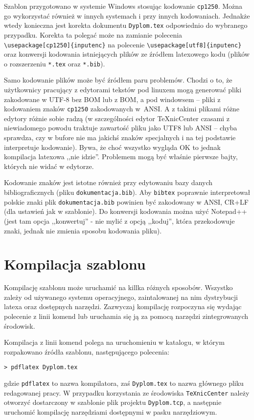 Szablon przygotowano w systemie Windows stosując kodowanie \texttt{cp1250}. Można go wykorzystać również w innych systemach i przy innych kodowaniach. Jednakże wtedy konieczna jest korekta dokumentu \texttt{Dyplom.tex} odpowiednio do wybranego przypadku. Korekta ta polegać może na zamianie polecenia \verb+\usepackage[cp1250]{inputenc}+  na polecenie \verb+\usepackage[utf8]{inputenc}+ oraz konwersji kodowania istniejących plików ze źródłem latexowego kodu (plików o rozszerzeniu \texttt{*.tex} oraz \texttt{*.bib}).

Samo kodowanie plików może być źródłem paru problemów. Chodzi o to, że użytkownicy pracujący z edytorami tekstów pod linuxem mogą generować pliki zakodowane w UTF-8 bez BOM lub z BOM, a pod windowsem -- pliki z kodowaniem znaków \texttt{cp1250} zakodowanych w~ANSI. A z takimi plikami różne edytory różnie sobie radzą (w szczególności edytor TeXnicCenter czasami z niewiadomego powodu traktuje zawartość pliku jako UTF8 lub ANSI -- chyba sprawdza, czy w bufore nie ma jakichś znaków specjalnych i na tej podstawie interpretuje kodowanie). Bywa, że choć wszystko wygląda OK to jednak kompilacja latexowa ,,nie idzie''. Problemem mogą być właśnie pierwsze bajty, których nie widać w edytorze. 

Kodowanie znaków jest istotne również przy edytowaniu bazy danych bibliograficznych (pliku \texttt{dokumentacja.bib}). Aby \texttt{bibtex} poprawnie interpretował polskie znaki plik \texttt{dokumentacja.bib} powinien być zakodowany w ANSI, CR+LF (dla ustawień jak w szablonie). Do konwersji kodowania można użyć Notepad++ (jest tam opcja ,,konwertuj'' - nie mylić z opcją ,,koduj'', która przekodowuje znaki, jednak nie zmienia sposobu kodowania pliku).



\section{Kompilacja szablonu}
Kompilację szablonu może uruchamić na killka różnych sposobów. Wszystko zależy od używanego systemu operacyjnego, zaintalowanej na nim dystrybucji latexa oraz dostępnych narzędzi. Zazwyczaj kompilację rozpoczyna się wydając polecenie z linii komend lub uruchamia się ją za pomocą narzędzi zintegrowanych środowisk.

Kompilacja z linii komend polega na uruchomieniu w katalogu, w którym rozpakowano źródła szablonu, następującego polecenia:
\begin{lstlisting}[basicstyle=\ttfamily]
> pdflatex Dyplom.tex
\end{lstlisting}
gdzie \texttt{pdflatex} to nazwa kompilatora, zaś \texttt{Dyplom.tex} to nazwa głównego pliku redagowanej pracy. 
W przypadku korzystania ze środowiska \texttt{TeXnicCenter} należy otworzyć dostarczony w szablonie plik projektu \texttt{Dyplom.tcp}, a następnie uruchomić kompilację narzędziami dostępnymi w pasku narzędziowym.

